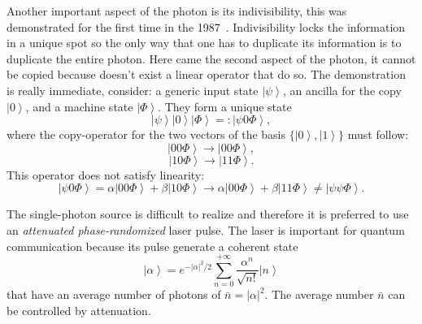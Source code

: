 Another important aspect of the photon is its indivisibility, this was demonstrated for the first time in the 1987~\cite{a23}. Indivisibility locks the information in a unique spot so the only way that one has to duplicate its information is to duplicate the entire photon. Here came the second aspect of the photon, it cannot be copied because doesn't exist a linear operator that do so. The demonstration is really immediate, consider: a generic input state $\left|\psi\right>$, an ancilla for the copy $\left|0\right>$, and a machine state $\left|\Phi\right>$. They form a unique state
\begin{equation}
  \left|\psi\right>\left|0\right>\left|\Phi\right> =: \left|\psi 0 \Phi\right>,
\end{equation}
where the copy-operator for the two vectors of the basis $\{\left|0\right>, \left|1\right>\}$ must follow:
\begin{equation}
  \left|0 0 \Phi\right> \to \left|0 0 \Phi\right>,
\end{equation}
\begin{equation}
  \left|1 0 \Phi\right> \to \left|1 1 \Phi\right>.
\end{equation}
This operator does not satisfy linearity:
\begin{equation}
  \left|\psi 0 \Phi\right> = \alpha\left|0 0 \Phi\right> + \beta\left|1 0 \Phi\right> \to \alpha\left|0 0 \Phi\right> + \beta\left|1 1 \Phi\right> \ne \left|\psi \psi \Phi\right>.
\end{equation}

The single-photon source is difficult to realize and therefore it is preferred to use an \textit{attenuated phase-randomized} laser pulse. The laser is important for quantum communication because its pulse generate a coherent state
\begin{equation}
  \left|\alpha\right> = e^{- |\alpha|^2 / 2} \sum_{n=0}^{+\infty} \frac{\alpha^n}{\sqrt{n!}} \left|n\right>
\end{equation}
that have an average number of photons of $\bar{n} = |\alpha|^2$. The average number $\bar{n}$ can be controlled by attenuation.


